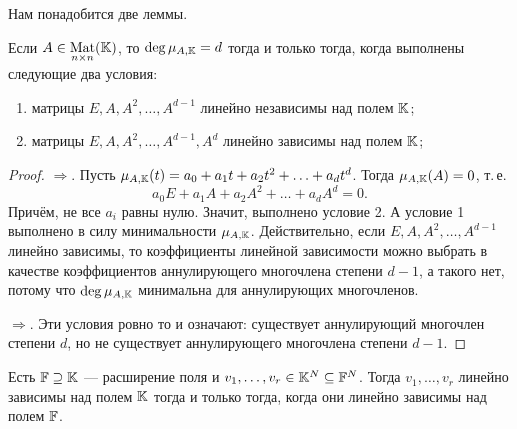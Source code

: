 Нам понадобится две леммы.

\begin{lemma}
    Если $A \in \underset{n \times n}{\operatorname{Mat}}(\mathbb{K})$, то $\deg\mu_{A, \mathbb{K}} = d$ тогда и только тогда, когда выполнены следующие два условия:
    \begin{enumerate}[nolistsep]
        \item матрицы $E, A, A^2, \ldots, A^{d - 1}$ линейно независимы над полем $\mathbb{K}$;
        \item матрицы $E, A, A^2, \ldots, A^{d - 1}, A^d$ линейно зависимы над полем $\mathbb{K}$;
    \end{enumerate}
\end{lemma}

\begin{proof}
    $\Rightarrow$. Пусть $\mu_{A, \mathbb{K}}(t) = a_0 + a_1t + a_2t^2 + \ldots + a_dt^d$. Тогда $\mu_{A, \mathbb{K}}(A) = 0$, т.\,е.
    \[
        a_0E + a_1A + a_2A^2 + \ldots + a_dA^d = 0.
    \]
    Причём, не все $a_i$ равны нулю. Значит, выполнено условие 2. А условие 1 выполнено в силу минимальности $\mu_{A, \mathbb{K}}$. Действительно, если $E, A, A^2, \ldots, A^{d - 1}$ линейно зависимы, то коэффициенты линейной зависимости можно выбрать в качестве коэффициентов аннулирующего многочлена степени $d - 1$, а такого нет, потому что $\deg\mu_{A, \mathbb{K}}$ минимальна для аннулирующих многочленов.

    $\Rightarrow$. Эти условия ровно то и означают: существует аннулирующий многочлен степени $d$, но не существует аннулирующего многочлена степени $d - 1$.
\end{proof}

\begin{lemma}
    Есть $\mathbb{F} \supseteq \mathbb{K}$ --- расширение поля и $v_1, \ldots, v_r \in \mathbb{K}^N \subseteq \mathbb{F}^N$. Тогда $v_1, \ldots, v_r$ линейно зависимы над полем $\mathbb{K}$ тогда и только тогда, когда они линейно зависимы над полем $\mathbb{F}$.
\end{lemma}

